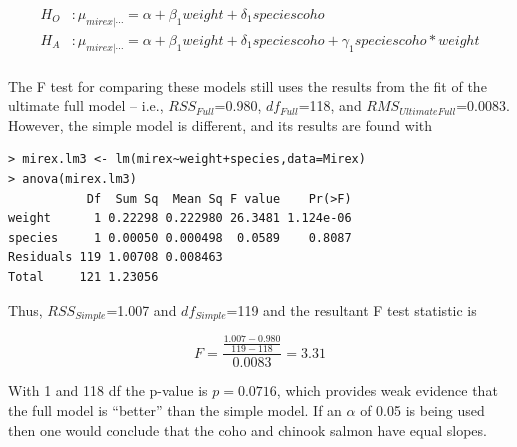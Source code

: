 \documentclass[10pt,openany]{book}\usepackage[]{graphicx}\usepackage[]{color}
\makeatletter
\newenvironment{kframe}{%
 \def\at@end@of@kframe{}%
 \ifinner\ifhmode%
  \def\at@end@of@kframe{\end{minipage}}%
  \begin{minipage}{\columnwidth}%
 \fi\fi%
 \def\FrameCommand##1{\hskip\@totalleftmargin \hskip-\fboxsep
 \colorbox{shadecolor}{##1}\hskip-\fboxsep
     \hskip-\linewidth \hskip-\@totalleftmargin \hskip\columnwidth}%
 \MakeFramed {\advance\hsize-\width
   \@totalleftmargin\z@ \linewidth\hsize
   \@setminipage}}%
 {\par\unskip\endMakeFramed%
 \at@end@of@kframe}
\newenvironment{knitrout}{}{} %
\makeatother
\begin{document}
\[ \begin{split}
  H_{O}&: \mu_{mirex|\cdots} = \alpha+\beta_{1}weight+\delta_{1}speciescoho \\
  H_{A}&: \mu_{mirex|\cdots} = \alpha+\beta_{1}weight+\delta_{1}speciescoho+\gamma_{1}speciescoho*weight \\
\end{split} \]

The F test for comparing these models still uses the results from the fit of the ultimate full model -- i.e., $RSS_{Full}$=0.980, $df_{Full}$=118, and $RMS_{Ultimate Full}$=0.0083.  However, the simple model is different, and its results are found with

\begin{knitrout}
\color{fgcolor}\begin{kframe}
\begin{verbatim}
> mirex.lm3 <- lm(mirex~weight+species,data=Mirex)
> anova(mirex.lm3)
           Df  Sum Sq  Mean Sq F value    Pr(>F)
weight      1 0.22298 0.222980 26.3481 1.124e-06
species     1 0.00050 0.000498  0.0589    0.8087
Residuals 119 1.00708 0.008463                  
Total     121 1.23056                           
\end{verbatim}
\end{kframe}
\end{knitrout}

Thus, $RSS_{Simple}$=1.007 and $df_{Simple}$=119 and the resultant F test statistic is

\[ F = \frac{\frac{1.007-0.980}{119-118}}{0.0083} = 3.31 \]

With 1 and 118 df the p-value is $p=0.0716$, which provides weak evidence that the full model is ``better'' than the simple model.  If an $\alpha$ of 0.05 is being used then one would conclude that the coho and chinook salmon have equal slopes.


\vspace{-12pt}
\end{document}
